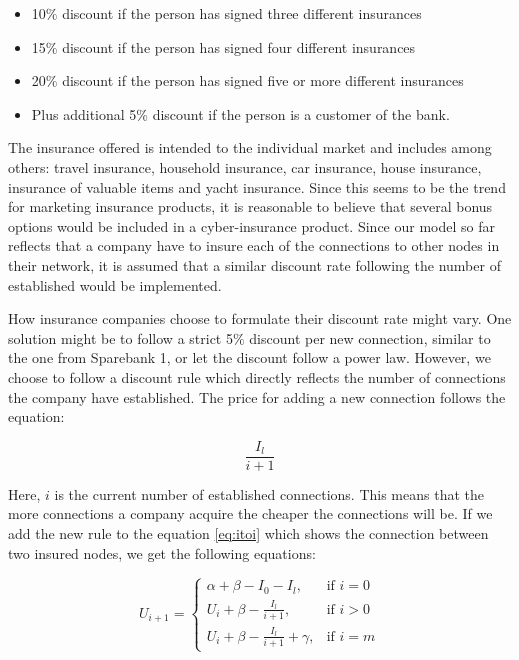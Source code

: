 \begin{itemize}

\item 10$\%$ discount if the person has signed three different insurances
\item 15$\%$ discount if the person has signed four different insurances
\item 20$\%$ discount if the person has signed five or more different insurances
\item Plus additional 5$\%$ discount if the person is a customer of the bank. 

\end{itemize}

The insurance offered is intended to the individual market and includes among others: travel insurance, household insurance, car insurance, house insurance, insurance of valuable items and yacht insurance. Since this seems to be the trend for marketing insurance products, it is reasonable to believe that several bonus options would be included in a cyber-insurance product. Since our model so far reflects that a company have to insure each of the connections to other nodes in their network, it is assumed that a similar discount rate following the number of established would be implemented. 

How insurance companies choose to formulate their discount rate might vary. One solution might be to follow a strict 5$\%$ discount per new connection, similar to the one from Sparebank 1, or let the discount follow a power law. However, we choose to follow a discount rule which directly reflects the number of connections the company have established. 
The price for adding a new connection follows the equation:

\begin{equation}
\frac{I_{l}}{i+1}
\label{eq:discount0}
\end{equation}

Here, $i$ is the current number of established connections. This means that the more connections a company acquire the cheaper the connections will be. 
If we add the new rule to the equation \ref{eq:itoi} which shows the connection between two insured nodes, we get the following equations: 

\begin{equation}
    U_{i+1}= 
\begin{cases}
    \alpha + \beta - I_{0} - I_{l},& \text{if } i = 0\\
    U_{i}+\beta -\frac{I_{l}}{i+1},& \text{if }  i>0\\
    U_{i}+\beta -\frac{I_{l}}{i+1}+\gamma,& \text{if } i=m
    
\end{cases}
\label{eq:discount1}
\end{equation}


